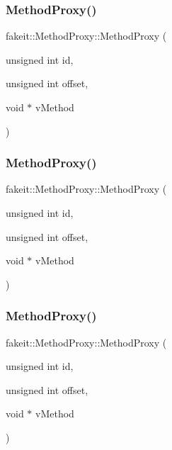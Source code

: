 \subsubsection{\texorpdfstring{MethodProxy()}{MethodProxy()}\hspace{0.1cm}{\footnotesize\ttfamily [4/9]}}
{\footnotesize\ttfamily fakeit\+::\+Method\+Proxy\+::\+Method\+Proxy (\begin{DoxyParamCaption}\item[{unsigned int}]{id,  }\item[{unsigned int}]{offset,  }\item[{void $\ast$}]{v\+Method }\end{DoxyParamCaption})\hspace{0.3cm}{\ttfamily [inline]}}

\mbox{\label{structfakeit_1_1MethodProxy_a425b37c610166fd5368505aa53cc970c}} 
\subsubsection{\texorpdfstring{MethodProxy()}{MethodProxy()}\hspace{0.1cm}{\footnotesize\ttfamily [5/9]}}
{\footnotesize\ttfamily fakeit\+::\+Method\+Proxy\+::\+Method\+Proxy (\begin{DoxyParamCaption}\item[{unsigned int}]{id,  }\item[{unsigned int}]{offset,  }\item[{void $\ast$}]{v\+Method }\end{DoxyParamCaption})\hspace{0.3cm}{\ttfamily [inline]}}

\mbox{\label{structfakeit_1_1MethodProxy_a425b37c610166fd5368505aa53cc970c}} 
\subsubsection{\texorpdfstring{MethodProxy()}{MethodProxy()}\hspace{0.1cm}{\footnotesize\ttfamily [6/9]}}
{\footnotesize\ttfamily fakeit\+::\+Method\+Proxy\+::\+Method\+Proxy (\begin{DoxyParamCaption}\item[{unsigned int}]{id,  }\item[{unsigned int}]{offset,  }\item[{void $\ast$}]{v\+Method }\end{DoxyParamCaption})\hspace{0.3cm}{\ttfamily [inline]}}

